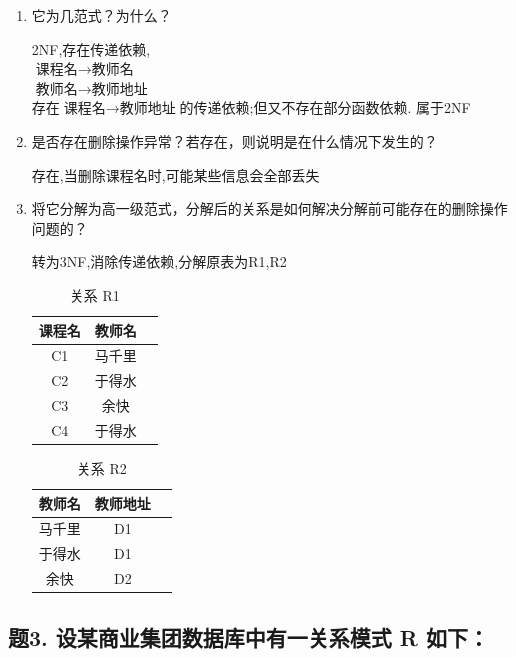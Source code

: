 \documentclass[a4paper,12pt,UTF8,fontset=none]{ctexart}
\begin{document}
\begin{enumerate}
    \item 它为几范式？为什么？
    \par 2NF,存在传递依赖,\\$\text{课程名} \rightarrow \text{教师名}$\\
    $\text{教师名} \rightarrow \text{教师地址}$\\
    存在$\text{课程名} \rightarrow \text{教师地址}$的传递依赖;但又不存在部分函数依赖.
    属于2NF
    \item 是否存在删除操作异常？若存在，则说明是在什么情况下发生的？
    \par 存在,当删除课程名时,可能某些信息会全部丢失
    \item 将它分解为高一级范式，分解后的关系是如何解决分解前可能存在的删除操作问题的？
    \par 转为3NF,消除传递依赖,分解原表为R1,R2
    \begin{table}[htbp]
        \centering
        \caption{关系 R1}
        \vskip 2mm
        \begin{tabular}{ccc}
            \toprule %
            \textbf{课程名} & \textbf{教师名}  \\ 
            \midrule %
            C1 & 马千里  \\ 
            C2 & 于得水  \\ 
            C3 & 余快  \\ 
            C4 & 于得水 \\ 
            \bottomrule %
        \end{tabular}
    \end{table}
    \begin{table}[htbp]
        \centering
        \caption{关系 R2}
        \vskip 2mm
        \begin{tabular}{ccc}
            \toprule %
             \textbf{教师名} & \textbf{教师地址} \\ 
            \midrule %
             马千里 & D1 \\ 
             于得水 & D1 \\ 
             余快 & D2 \\ 
            \bottomrule %
        \end{tabular}
    \end{table}
\end{enumerate}
\FloatBarrier
\subsection*{题3. 设某商业集团数据库中有一关系模式 R 如下：}
\end{document}
